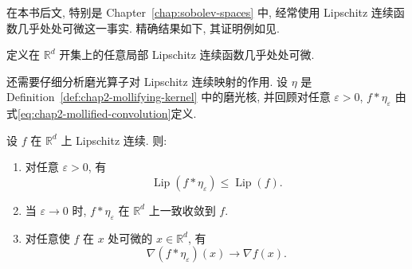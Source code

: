 在本书后文, 特别是 Chapter~\ref{chap:sobolev-spaces} 中, 经常使用 Lipschitz 连续函数几乎处处可微这一事实. 精确结果如下, 其证明例如见.

\begin{Theorem}[Rademacher]
\label{thm:chap2-rademacher}
定义在 $\mathbb{R}^d$ 开集上的任意局部 Lipschitz 连续函数几乎处处可微.
\end{Theorem}

还需要仔细分析磨光算子对 Lipschitz 连续映射的作用. 设 $\eta$ 是 Definition~\ref{def:chap2-mollifying-kernel} 中的磨光核, 并回顾对任意 $\varepsilon>0$, $f*\eta_\varepsilon$ 由式\eqref{eq:chap2-mollified-convolution}定义.

\begin{Proposition}
\label{prop:chap2-mollification-lipschitz}
设 $f$ 在 $\mathbb{R}^d$ 上 Lipschitz 连续. 则:
\begin{enumerate}
\item 对任意 $\varepsilon>0$, 有
\[
  \operatorname{Lip}(f*\eta_\varepsilon)\leq\operatorname{Lip}(f).
\]
\item 当 $\varepsilon\to0$ 时, $f*\eta_\varepsilon$ 在 $\mathbb{R}^d$ 上一致收敛到 $f$.
\item 对任意使 $f$ 在 $x$ 处可微的 $x\in\mathbb{R}^d$, 有
\[
  \nabla(f*\eta_\varepsilon)(x)\longrightarrow\nabla f(x).
\]
\end{enumerate}
\end{Proposition}

